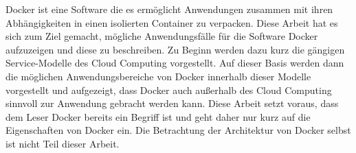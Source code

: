 \label{sec:zusammenfassung}
Docker ist eine Software die es ermöglicht Anwendungen zusammen mit ihren Abhängigkeiten in einen isolierten Container zu verpacken.
Diese Arbeit hat es sich zum Ziel gemacht, mögliche Anwendungsfälle für die Software Docker aufzuzeigen und diese zu beschreiben.
Zu Beginn werden dazu kurz die gängigen Service-Modelle des Cloud Computing vorgestellt.
Auf dieser Basis werden dann die möglichen Anwendungsbereiche von Docker innerhalb dieser Modelle vorgestellt und aufgezeigt, dass Docker auch außerhalb des Cloud Computing sinnvoll zur Anwendung gebracht werden kann.
Diese Arbeit setzt voraus, dass dem Leser Docker bereits ein Begriff ist und geht daher nur kurz auf 
die Eigenschaften von Docker ein. Die Betrachtung der Architektur von Docker selbst ist nicht Teil dieser Arbeit.

